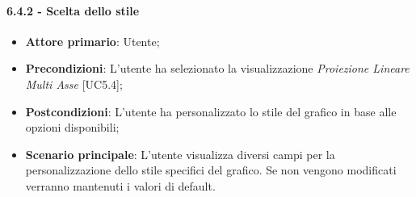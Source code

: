 \paragraph{6.4.2 - Scelta dello stile}
\begin{itemize}
	\item \textbf{Attore primario}: Utente;
	\item \textbf{Precondizioni}: L'utente ha selezionato la visualizzazione \textit{Proiezione Lineare Multi Asse} [UC5.4];
	\item \textbf{Postcondizioni}: L'utente ha personalizzato lo stile del grafico in base alle opzioni disponibili;
	
	\item \textbf{Scenario principale}: L'utente visualizza diversi campi per la personalizzazione dello stile specifici del grafico. Se non vengono modificati verranno mantenuti i valori di default. 
\end{itemize}